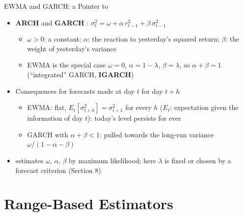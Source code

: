 \begin{frame}{EWMA and GARCH: a Pointer to }
\itemsize{\small}
\begin{itemize}
    \item \textbf{ARCH}  and \textbf{GARCH} : $\sigma_t^2 = \omega + \alpha\, r_{t-1}^2 + \beta\,\sigma_{t-1}^2$
    \begin{itemize}
        \item $\omega > 0$: a constant; $\alpha$: the reaction to yesterday's squared return; $\beta$: the weight of yesterday's variance
        \item EWMA is the special case $\omega = 0$, $\alpha = 1 - \lambda$, $\beta = \lambda$, so $\alpha + \beta = 1$ (``integrated'' GARCH, \textbf{IGARCH})
    \end{itemize}
    \item Consequences for forecasts made at day $t$ for day $t + h$
    \begin{itemize}
        \item EWMA: flat, $E_t[\sigma_{t+h}^2] = \sigma_{t+1}^2$ for every $h$ ($E_t$: expectation given the information of day $t$): today's level persists for ever
        \item GARCH with $\alpha + \beta < 1$: pulled towards the long-run variance $\omega/(1 - \alpha - \beta)$
    \end{itemize}
    \item {} estimates $\omega$, $\alpha$, $\beta$ by maximum likelihood; here $\lambda$ is fixed or chosen by a forecast criterion (Section 8)
\end{itemize}
\end{frame}


\section{Range-Based Estimators}

